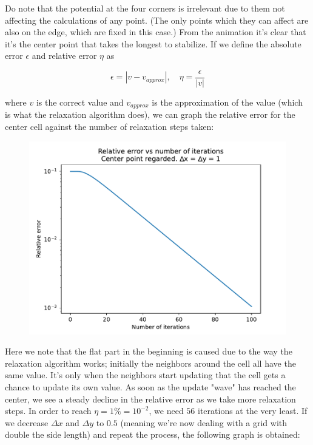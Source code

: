 \documentclass[a4paper,12pt]{article}
\begin{document}
Do note that the potential at the four corners is irrelevant due to them not affecting the calculations of any point.
(The only points which they can affect are also on the edge, which are fixed in this case.) From the animation it's
clear that it's the center point that takes the longest to stabilize. If we define the absolute error $\epsilon$ and
relative error $\eta$ as

\begin{equation*}
  \epsilon = | v - v_{approx} |,\quad \eta = \frac{\epsilon}{|v|}
\end{equation*}

where $v$ is the correct value and $v_{approx}$ is the approximation of the value (which is what the relaxation
algorithm does), we can graph the relative error for the center cell against the number of relaxation steps taken:

\begin{figure}[!ht]
  \centering
  \includegraphics[scale=0.49]{img/4_1a_errorvsn_default.pdf}
\end{figure}

Here we note that the flat part in the beginning is caused due to the way the relaxation algorithm works; initially
the neighbors around the cell all have the same value. It's only when the neighbors start updating that the cell gets
a chance to update its own value. As soon as the update "wave" has reached the center, we see a steady decline in
the relative error as we take more relaxation steps. In order to reach $\eta = 1\% = 10^{-2}$, we need $56$ iterations
at the very least. If we decrease $\Delta x$ and $\Delta y$ to $0.5$ (meaning we're now dealing with a grid with
double the side length) and repeat the process, the following graph is obtained:
\end{document}
